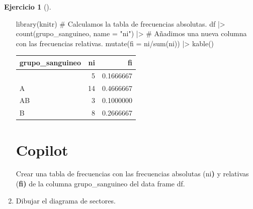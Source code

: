 \documentclass[
  a4paper,
]{scrreport}
\newenvironment{Shaded}{\begin{snugshade}}{\end{snugshade}}
\newcommand{\AttributeTok}[1]{\textcolor[rgb]{0.40,0.45,0.13}{#1}}
\newcommand{\CommentTok}[1]{\textcolor[rgb]{0.37,0.37,0.37}{#1}}
\newcommand{\ControlFlowTok}[1]{\textcolor[rgb]{0.00,0.23,0.31}{\textbf{#1}}}
\newcommand{\ErrorTok}[1]{\textcolor[rgb]{0.68,0.00,0.00}{#1}}
\newcommand{\ExtensionTok}[1]{\textcolor[rgb]{0.00,0.23,0.31}{#1}}
\newcommand{\FunctionTok}[1]{\textcolor[rgb]{0.28,0.35,0.67}{#1}}
\newcommand{\KeywordTok}[1]{\textcolor[rgb]{0.00,0.23,0.31}{\textbf{#1}}}
\newcommand{\NormalTok}[1]{\textcolor[rgb]{0.00,0.23,0.31}{#1}}
\newcommand{\SpecialCharTok}[1]{\textcolor[rgb]{0.37,0.37,0.37}{#1}}
\newcommand{\StringTok}[1]{\textcolor[rgb]{0.13,0.47,0.30}{#1}}
\theoremstyle{definition}
\newtheorem{exercise}{Ejercicio}[chapter]
\theoremstyle{remark}
\begin{document}
\begin{exercise}[]
\begin{enumerate}
\begin{tcolorbox}
\begin{Shaded}
\begin{Highlighting}[]
\FunctionTok{library}\NormalTok{(knitr)}
\CommentTok{\# Calculamos la tabla de frecuencias absolutas.}
\NormalTok{df }\SpecialCharTok{|\textgreater{}} \FunctionTok{count}\NormalTok{(grupo\_sanguineo, }\AttributeTok{name =} \StringTok{"ni"}\NormalTok{) }\SpecialCharTok{|\textgreater{}} 
    \CommentTok{\# Añadimos una nueva columna con las frecuencias relativas.}
    \FunctionTok{mutate}\NormalTok{(}\AttributeTok{fi =}\NormalTok{ ni}\SpecialCharTok{/}\FunctionTok{sum}\NormalTok{(ni)) }\SpecialCharTok{|\textgreater{}}
    \FunctionTok{kable}\NormalTok{()}
\end{Highlighting}
\end{Shaded}

  \begin{longtable}[]{@{}lrr@{}}
  \toprule\noalign{}
  grupo\_sanguineo & ni & fi \\
  \midrule\noalign{}
  \endhead
  \bottomrule\noalign{}
  \endlastfoot
  0 & 5 & 0.1666667 \\
  A & 14 & 0.4666667 \\
  AB & 3 & 0.1000000 \\
  B & 8 & 0.2666667 \\
  \end{longtable}

  \section{Copilot}

\begin{Shaded}
\begin{Highlighting}[]
\ExtensionTok{Crear}\NormalTok{ una tabla de frecuencias con las frecuencias absolutas }\ErrorTok{(}\ExtensionTok{ni}\KeywordTok{)} \ExtensionTok{y}\NormalTok{ relativas }\ErrorTok{(}\ControlFlowTok{fi}\KeywordTok{)} \ExtensionTok{de}\NormalTok{ la columna grupo\_sanguineo del data frame df.}
\end{Highlighting}
\end{Shaded}

  \end{tcolorbox}
\item
  Dibujar el diagrama de sectores.

  \begin{tcolorbox}[enhanced jigsaw, colframe=quarto-callout-tip-color-frame, toprule=.15mm, bottomtitle=1mm, breakable, opacitybacktitle=0.6, toptitle=1mm, colback=white, bottomrule=.15mm, title=\textcolor{quarto-callout-tip-color}{\faLightbulb}\hspace{0.5em}{Solución}, arc=.35mm, left=2mm, titlerule=0mm, rightrule=.15mm, coltitle=black, leftrule=.75mm, opacityback=0, colbacktitle=quarto-callout-tip-color!10!white]


\end{tcolorbox}
\end{enumerate}
\end{exercise}
\end{document}
